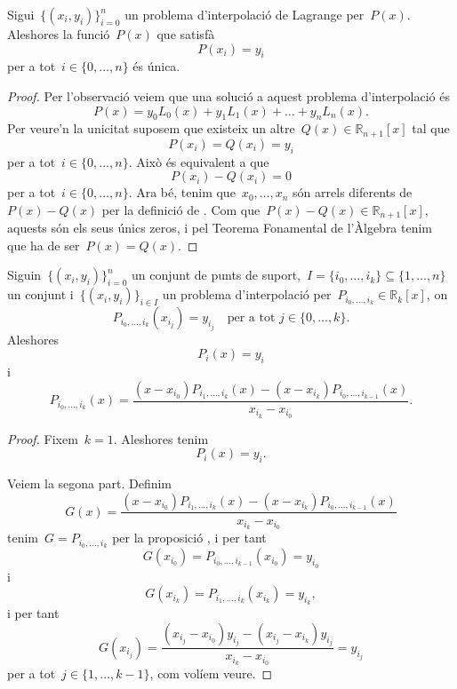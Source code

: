 \documentclass[../../main.tex]{subfiles}
\begin{document}
    \begin{proposition}\label{prop:unicitat interpolació de Lagrange}
        Sigui~\(\{(x_{i},y_{i})\}_{i=0}^{n}\) un problema d'interpolació de Lagrange per~\(P(x)\).
        Aleshores la funció~\(P(x)\) que satisfà
        \[
            P(x_{i})=y_{i}
        \]
        per a tot~\(i\in\{0,\dots,n\}\) és única.
        \begin{proof}
            Per l'observació  veiem que una solució a aquest problema d'interpolació és
            \[
                P(x)=y_{0}L_{0}(x)+y_{1}L_{1}(x)+\dots+y_{n}L_{n}(x).
            \]
            Per veure'n la unicitat suposem que existeix un altre~\(Q(x)\in\mathbb{R}_{n+1}[x]\) tal que
            \[
                P(x_{i})=Q(x_{i})=y_{i}
            \]
            per a tot~\(i\in\{0,\dots,n\}\).
            Això és equivalent a que
            \[
                P(x_{i})-Q(x_{i})=0
            \]
            per a tot~\(i\in\{0,\dots,n\}\).
            Ara bé, tenim que~\(x_{0},\dots,x_{n}\) són arrels diferents de~\(P(x)-Q(x)\) per la definició de .
            Com que~\(P(x)-Q(x)\in\mathbb{R}_{n+1}[x]\), aquests són els seus únics zeros, i pel Teorema Fonamental de l'Àlgebra tenim que ha de ser~\(P(x)=Q(x)\).
        \end{proof}
    \end{proposition}
    \begin{proposition}\label{prop:Algorisme de Neville}
        Siguin~\(\{(x_{i},y_{i})\}_{i=0}^{n}\) un conjunt de punts de suport,~\(I=\{i_{0},\dots,i_{k}\}\subseteq\{1,\dots,n\}\) un conjunt i~\(\{(x_{i},y_{i})\}_{i\in I}\) un problema d'interpolació per~\(P_{i_{0},\dots,i_{k}}\in\mathbb{R}_{k}[x]\), on
        \[
            P_{i_{0},\dots,i_{k}}\left(x_{i_{j}}\right)=y_{i_{j}}\quad\text{per a tot }j\in\{0,\dots,k\}.
        \]
        Aleshores
        \[
            P_{i}(x)=y_{i}
        \]
        i
        \[
            P_{i_{0},\dots,i_{k}}(x)=\frac{\left(x-x_{i_{0}}\right)P_{i_{1},\dots,i_{k}}(x)-\left(x-x_{i_{k}}\right)P_{i_{0},\dots,i_{k-1}}(x)}{x_{i_{k}}-x_{i_{0}}}.
        \]
        \begin{proof}
            Fixem~\(k=1\).
            Aleshores tenim
            \[
                P_{i}(x)=y_{i}.
            \]

            Veiem la segona part.
            Definim
            \[
                G(x)=\frac{\left(x-x_{i_{0}}\right)P_{i_{1},\dots,i_{k}}(x)-\left(x-x_{i_{k}}\right)P_{i_{0},\dots,i_{k-1}}(x)}{x_{i_{k}}-x_{i_{0}}}
            \]
            tenim~\(G=P_{i_{0},\dots,i_{k}}\) per la proposició , i per tant
            \[
                G(x_{i_{0}})=P_{i_{0},\dots,i_{k-1}}(x_{i_0})=y_{i_{0}}
            \]
            i
            \[
                G(x_{i_{k}})=P_{i_{1},\dots,i_{k}}(x_{i_k})=y_{i_{k}},
            \]
            i per tant
            \[
                G(x_{i_{j}})=\frac{(x_{i_{j}}-x_{i_{0}})y_{i_{j}}-(x_{i_{j}}-x_{i_{k}})y_{i_{j}}}{x_{i_{k}}-x_{i_{0}}}=y_{i_{j}}
            \]
            per a tot~\(j\in\{1,\dots,k-1\}\), com volíem veure.
        \end{proof}
    \end{proposition}
\end{document}
